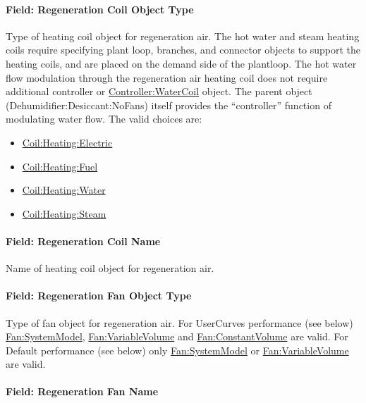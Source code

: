 \paragraph{Field: Regeneration Coil Object Type}\label{field-regeneration-coil-object-type}

Type of heating coil object for regeneration air. The hot water and steam heating coils require specifying plant loop, branches, and connector objects to support the heating coils, and are placed on the demand side of the plantloop. The hot water flow modulation through the regeneration air heating coil does not require additional controller or \hyperref[controllerwatercoil]{Controller:WaterCoil} object. The parent object (Dehumidifier:Desiccant:NoFans) itself provides the ``controller'' function of modulating water flow. The valid choices are:

\begin{itemize}
\item
  \hyperref[coilheatingelectric]{Coil:Heating:Electric}
\item
  \hyperref[coilheatinggas-000]{Coil:Heating:Fuel}
\item
  \hyperref[coilheatingwater]{Coil:Heating:Water}
\item
  \hyperref[coilheatingsteam]{Coil:Heating:Steam}
\end{itemize}

\paragraph{Field: Regeneration Coil Name}\label{field-regeneration-coil-name}

Name of heating coil object for regeneration air.

\paragraph{Field: Regeneration Fan Object Type}\label{field-regeneration-fan-object-type}

Type of fan object for regeneration air. For UserCurves performance (see below) \hyperref[fansystemmodel]{Fan:SystemModel}, \hyperref[fanvariablevolume]{Fan:VariableVolume} and \hyperref[fanconstantvolume]{Fan:ConstantVolume} are valid. For Default performance (see below) only \hyperref[fansystemmodel]{Fan:SystemModel} or \hyperref[fanvariablevolume]{Fan:VariableVolume} are valid.

\paragraph{Field: Regeneration Fan Name}\label{field-regeneration-fan-name}

